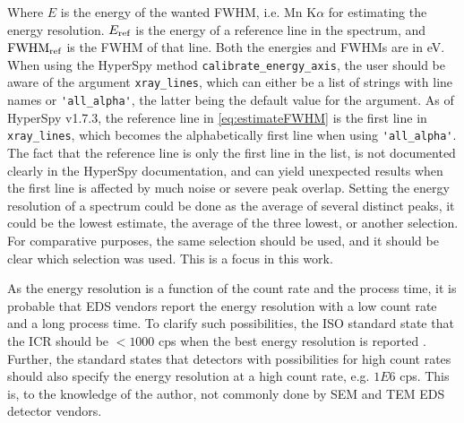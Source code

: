 Where $E$ is the energy of the wanted FWHM, i.e. Mn K$\alpha$ for estimating the energy resolution.
$E_\textnormal{ref}$ is the energy of a reference line in the spectrum, and $\textnormal{FWHM}_{\textnormal{ref}}$ is the FWHM of that line.
Both the energies and FWHMs are in eV.
When using the HyperSpy method \verb|calibrate_energy_axis|, the user should be aware of the argument \verb|xray_lines|, which can either be a list of strings with line names or \verb|'all_alpha'|, the latter being the default value for the argument.
As of HyperSpy v1.7.3, the reference line in \cref{eq:estimateFWHM} is the first line in \verb|xray_lines|, which becomes the alphabetically first line when using \verb|'all_alpha'|.
The fact that the reference line is only the first line in the list, is not documented clearly in the HyperSpy documentation, and can yield unexpected results when the first line is affected by much noise or severe peak overlap.
Setting the energy resolution of a spectrum could be done as the average of several distinct peaks, it could be the lowest estimate, the average of the three lowest, or another selection.
For comparative purposes, the same selection should be used, and it should be clear which selection was used.
This is a focus in this work.


As the energy resolution is a function of the count rate and the process time, it is probable that EDS vendors report the energy resolution with a low count rate and a long process time.
To clarify such possibilities, the ISO standard state that the ICR should be $< 1000$ cps when the best energy resolution is reported \cite{iso_qc_15632}.
Further, the standard states that detectors with possibilities for high count rates should also specify the energy resolution at a high count rate, e.g. $1E6$ cps.
This is, to the knowledge of the author, not commonly done by SEM and TEM EDS detector vendors.



